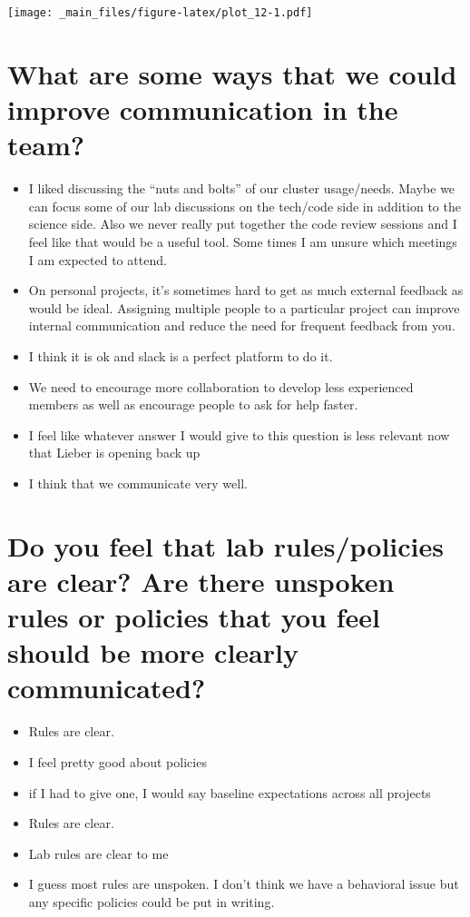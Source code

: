 \documentclass[
]{book}
\providecommand{\tightlist}{%
  \setlength{\itemsep}{0pt}\setlength{\parskip}{0pt}}
\begin{document}
\texttt{[image: \_main\_files/figure-latex/plot\_12-1.pdf]}

\hypertarget{what-are-some-ways-that-we-could-improve-communication-in-the-team}{%
\section{What are some ways that we could improve communication in the team?}\label{what-are-some-ways-that-we-could-improve-communication-in-the-team}}

\begin{itemize}
\tightlist
\item
  I liked discussing the ``nuts and bolts'' of our cluster usage/needs. Maybe we can focus some of our lab discussions on the tech/code side in addition to the science side. Also we never really put together the code review sessions and I feel like that would be a useful tool. Some times I am unsure which meetings I am expected to attend.
\item
  On personal projects, it's sometimes hard to get as much external feedback as would be ideal. Assigning multiple people to a particular project can improve internal communication and reduce the need for frequent feedback from you.
\item
  I think it is ok and slack is a perfect platform to do it.
\item
  We need to encourage more collaboration to develop less experienced members as well as encourage people to ask for help faster.
\item
  I feel like whatever answer I would give to this question is less relevant now that Lieber is opening back up
\item
  I think that we communicate very well.
\end{itemize}

\hypertarget{do-you-feel-that-lab-rulespolicies-are-clear-are-there-unspoken-rules-or-policies-that-you-feel-should-be-more-clearly-communicated}{%
\section{Do you feel that lab rules/policies are clear? Are there unspoken rules or policies that you feel should be more clearly communicated?}\label{do-you-feel-that-lab-rulespolicies-are-clear-are-there-unspoken-rules-or-policies-that-you-feel-should-be-more-clearly-communicated}}

\begin{itemize}
\tightlist
\item
  Rules are clear.
\item
  I feel pretty good about policies
\item
  if I had to give one, I would say baseline expectations across all projects
\item
  Rules are clear.
\item
  Lab rules are clear to me
\item
  I guess most rules are unspoken. I don't think we have a behavioral issue but any specific policies could be put in writing.
\end{itemize}
\end{document}
